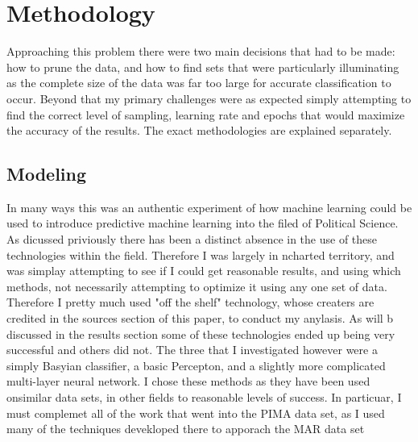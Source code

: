 \documentclass[12pt]{article}
\begin{document}
\section{Methodology}
Approaching this problem there were two main decisions that had to be made: how to prune the data, and how to find sets that were particularly illuminating as  the complete size of the data was far too large for accurate classification to occur. Beyond that my primary challenges were as expected simply attempting to find the correct level of sampling, learning rate and epochs that would maximize the accuracy of the results. The exact methodologies are explained separately.

\subsection{Modeling}
In many ways this was an authentic experiment of how machine learning could be used to introduce predictive machine learning into the filed of Political Science. As dicussed priviously there has been a distinct absence in the use of these technologies within the field. Therefore I was largely in ncharted territory, and was simplay attempting to see if I could get reasonable results, and using which methods, not necessarily attempting to optimize it using any one set of data. Therefore I pretty much used {"off the shelf"} technology, whose creaters are credited in the sources section of this paper, to conduct my anylasis. As will b discussed in the results section some of these technologies ended up being very successful and others did not. The three that I investigated however were a simply Basyian classifier, a basic Percepton, and a slightly more complicated multi-layer neural network. I chose these methods as they have been used onsimilar data sets, in other fields to reasonable levels of success. In particuar, I must complemet all of the work that went into the PIMA data set, as I used many of the techniques devekloped there to apporach the MAR data set
\end{document}

